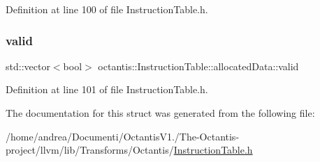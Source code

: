 Definition at line 100 of file Instruction\+Table.\+h.

\mbox{\label{structoctantis_1_1InstructionTable_1_1allocatedData_aa7c0311cec133ea705cb67da27b1b48a}} 
\subsubsection{\texorpdfstring{valid}{valid}}
{\footnotesize\ttfamily std\+::vector$<$bool$>$ octantis\+::\+Instruction\+Table\+::allocated\+Data\+::valid}



Definition at line 101 of file Instruction\+Table.\+h.



The documentation for this struct was generated from the following file\+:\begin{DoxyCompactItemize}
\item 
/home/andrea/\+Documenti/\+Octantis\+V1./\+The-\/\+Octantis-\/project/llvm/lib/\+Transforms/\+Octantis/\hyperlink{InstructionTable_8h}{Instruction\+Table.\+h}\end{DoxyCompactItemize}

